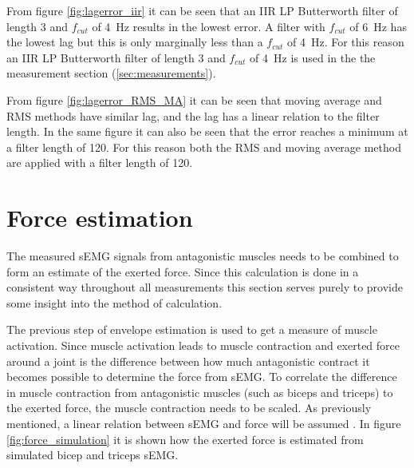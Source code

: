 From figure \ref{fig:lagerror_iir} it can be seen that an IIR LP Butterworth filter of length 3 and $f_{cut}$ of \SI{4}{\hertz} results in the lowest error. A filter with $f_{cut}$ of \SI{6}{\hertz} has the lowest lag but this is only marginally less than a $f_{cut}$ of \SI{4}{\hertz}. For this reason an IIR LP Butterworth filter of length 3 and $f_{cut}$ of \SI{4}{\hertz} is used in the the measurement section (\ref{sec:measurements}).

From figure \ref{fig:lagerror_RMS_MA} it can be seen that moving average and RMS methods have similar lag, and the lag has a linear relation to the filter length. In the same figure it can also be seen that the error reaches a minimum at a filter length of 120. For this reason both the RMS and moving average method are applied with a filter length of 120.

\section{Force estimation}\label{section:force_estimation}
The measured sEMG signals from antagonistic muscles needs to be combined to form an estimate of the exerted force. Since this calculation is done in a consistent way throughout all measurements this section serves purely to provide some insight into the method of calculation.

The previous step of envelope estimation is used to get a measure of muscle activation. Since muscle activation leads to muscle contraction and exerted force around a joint is the difference between how much antagonistic contract \cite{human_robotics} it becomes possible to determine the force from sEMG. To correlate the difference in muscle contraction from antagonistic muscles (such as biceps and triceps) to the exerted force, the muscle contraction needs to be scaled. As previously mentioned, a linear relation between sEMG and force will be assumed \cite{adaptive_filter_dry_electrode} \cite{interpreting_muscle_function_from_emg}. In figure \ref{fig:force_simulation} it is shown how the exerted force is estimated from simulated bicep and triceps sEMG. 


